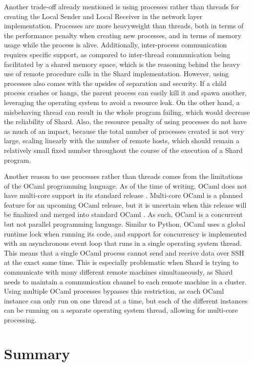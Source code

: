 \documentclass[oneside]{report}
\begin{document}
Another trade-off already mentioned is using processes rather than threads for creating the Local Sender and Local Receiver in the network layer implementation.
Processes are more heavyweight than threads, both in terms of the performance penalty when creating new processes, and in terms of memory usage while the process is alive.
Additionally, inter-process communication requires specific support, as compared to inter-thread communication being facilitated by a shared memory space, which is the reasoning behind the heavy use of remote procedure calls in the Shard implementation.
However, using processes also comes with the upsides of separation and security.
If a child process crashes or hangs, the parent process can easily kill it and spawn another, leveraging the operating system to avoid a resource leak.
On the other hand, a misbehaving thread can result in the whole program failing, which would decrease the reliability of Shard.
Also, the resource penalty of using processes do not have as much of an impact, because the total number of processes created is not very large, scaling linearly with the number of remote hosts, which should remain a relatively small fixed number throughout the course of the execution of a Shard program.

Another reason to use processes rather than threads comes from the limitations of the OCaml programming language.
As of the time of writing, OCaml does not have multi-core support in its standard release
\cite{dolan2014multicore}.
Multi-core OCaml is a planned feature for an upcoming OCaml release, but it is uncertain when this release will be finalized and merged into standard OCaml \cite{sivaramakrishnan2020retrofitting}.
As such, OCaml is a concurrent but not parallel programming language.
Similar to Python, OCaml uses a global runtime lock when running its code, and support for concurrency is implemented with an asynchronous event loop that runs in a single operating system thread.
This means that a single OCaml process cannot send and receive data over SSH at the exact same time.
This is especially problematic when Shard is trying to communicate with many different remote machines simultaneously, as Shard needs to maintain a communication channel to each remote machine in a cluster.
Using multiple OCaml processes bypasses this restriction, as each OCaml instance can only run on one thread at a time, but each of the different instances can be running on a separate operating system thread, allowing for multi-core processing.

\section{Summary}
\end{document}
